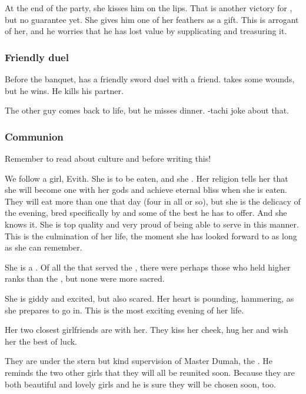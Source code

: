 \begin{garbage}
At the end of the party, she kisses him on the lips. 
That is another victory for \Teshrial, but no guarantee yet. 
She gives him one of her feathers as a gift. 
This is arrogant of her, and he worries that he has lost value by supplicating and treasuring it. 





\subsubsection{Friendly duel}
Before the banquet, \Teshrial{} has a friendly sword duel with a \resphan{} friend. 
\Teshrial{} takes some wounds, but he wins. 
He kills his partner. 

The other guy comes back to life, but he misses dinner. 
\Teshrial-tachi joke about that. 





\subsubsection{Communion}
Remember to read about \hs{\resphan} culture and  before writing this!

We follow a \hs{\naor} girl, {Evith}. 
She is to be eaten, and she . 
Her religion tells her that she will become one with her gods and achieve eternal bliss when she is eaten. 
They will eat more than one \human{} that day (four in all or so), but she is the delicacy of the evening, bred specifically by \Teshrial{} and some of the best he has to offer. 
And she knows it. 
She is top quality and very proud of being able to serve in this manner. 
This is the culmination of her life, the moment she has looked forward to as long as she can remember. 

She is a \naor. 
Of all the \humans{} that served the \resphain, there were perhaps those who held higher ranks than the \naorim, but none were more sacred. 

She is giddy and excited, but also scared. 
Her heart is pounding, hammering, as she prepares to go in. 
This is the most exciting evening of her life. 

Her two closest girlfriends are with her. 
They kiss her cheek, hug her and wish her the best of luck. 

They are under the stern but kind supervision of Master Dumah, the . 
He reminds the two other girls that they will all be reunited soon. 
Because they are both beautiful and lovely girls and he is sure they will be chosen soon, too. 


\end{garbage}
